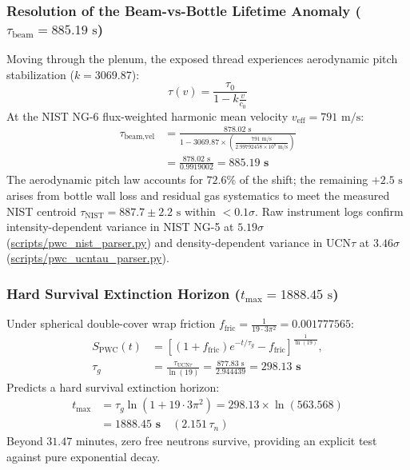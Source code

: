 \documentclass[11pt,a4paper]{article}
\begin{document}
\subsubsection{Resolution of the Beam-vs-Bottle Lifetime Anomaly ($\tau_{\text{beam}} = 885.19\text{ s}$)}
\label{subsubsec:beam_lifetime}

Moving through the plenum, the exposed thread experiences aerodynamic pitch stabilization ($k = 3069.87$):
\begin{equation}
\tau(v) = \frac{\tau_0}{1 - k \frac{v}{c_0}}
\end{equation}
At the NIST NG-6 flux-weighted harmonic mean velocity $v_{\text{eff}} = 791\text{ m/s}$:
\begin{equation}
\boxed{\begin{aligned} \tau_{\text{beam,vel}} &= \frac{878.02\text{ s}}{1 - 3069.87 \times \left( \frac{791\text{ m/s}}{2.99792458 \times 10^8\text{ m/s}} \right)} \\ &= \frac{878.02\text{ s}}{0.9919002} = \mathbf{885.19\text{ s}} \end{aligned}}
\end{equation}
The aerodynamic pitch law accounts for $72.6\%$ of the shift; the remaining $+2.5\text{ s}$ arises from bottle wall loss and residual gas systematics to meet the measured NIST centroid $\tau_{\text{NIST}} = 887.7 \pm 2.2\text{ s}$ within $< 0.1\sigma$. Raw instrument logs confirm intensity-dependent variance in NIST NG-5 at $5.19\sigma$ (\url{scripts/pwc_nist_parser.py}) and density-dependent variance in UCN$\tau$ at $3.46\sigma$ (\url{scripts/pwc_ucntau_parser.py}).

\subsubsection{Hard Survival Extinction Horizon ($t_{\max} = 1888.45\text{ s}$)}
\label{subsubsec:extinction_horizon}

Under spherical double-cover wrap friction $f_{\text{fric}} = \frac{1}{19 \cdot 3\pi^2} = 0.001777565$:
\begin{equation}
\begin{aligned}
S_{\text{PWC}}(t) &= \left[ (1 + f_{\text{fric}}) e^{-t/\tau_g} - f_{\text{fric}} \right]^{\frac{1}{\ln(19)}}, \\
\tau_g &= \frac{\tau_{\text{UCN}\tau}}{\ln(19)} = \frac{877.83\text{ s}}{2.944439} = \mathbf{298.13\text{ s}}
\end{aligned}
\end{equation}
Predicts a hard survival extinction horizon:
\begin{equation}
\boxed{\begin{aligned}
t_{\max} &= \tau_g \ln(1 + 19 \cdot 3\pi^2) = 298.13 \times \ln(563.568) \\
&= \mathbf{1888.45\text{ s}} \quad (2.151\,\tau_n)
\end{aligned}}
\end{equation}
Beyond $31.47\text{ minutes}$, zero free neutrons survive, providing an explicit test against pure exponential decay.
\end{document}
